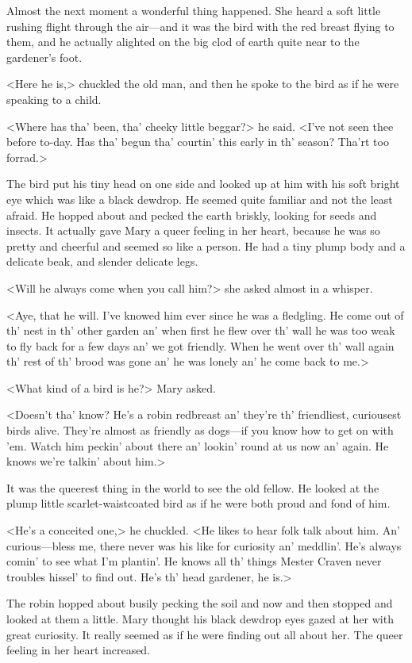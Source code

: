 Almost the next moment a wonderful thing happened. She heard a soft little rushing flight through the air—and it was the bird with the red breast flying to them, and he actually alighted on the big clod of earth quite near to the gardener's foot.

<Here he is,> chuckled the old man, and then he spoke to the bird as if he were speaking to a child.

<Where has tha' been, tha' cheeky little beggar?> he said. <I've not seen thee before to-day. Has tha' begun tha' courtin' this early in th' season? Tha'rt too forrad.>

The bird put his tiny head on one side and looked up at him with his soft bright eye which was like a black dewdrop. He seemed quite familiar and not the least afraid. He hopped about and pecked the earth briskly, looking for seeds and insects. It actually gave Mary a queer feeling in her heart, because he was so pretty and cheerful and seemed so like a person. He had a tiny plump body and a delicate beak, and slender delicate legs.

<Will he always come when you call him?> she asked almost in a whisper.

<Aye, that he will. I've knowed him ever since he was a fledgling. He come out of th' nest in th' other garden an' when first he flew over th' wall he was too weak to fly back for a few days an' we got friendly. When he went over th' wall again th' rest of th' brood was gone an' he was lonely an' he come back to me.>

<What kind of a bird is he?> Mary asked.

<Doesn't tha' know? He's a robin redbreast an' they're th' friendliest, curiousest birds alive. They're almost as friendly as dogs—if you know how to get on with 'em. Watch him peckin' about there an' lookin' round at us now an' again. He knows we're talkin' about him.>

It was the queerest thing in the world to see the old fellow. He looked at the plump little scarlet-waistcoated bird as if he were both proud and fond of him.

<He's a conceited one,> he chuckled. <He likes to hear folk talk about him. An' curious—bless me, there never was his like for curiosity an' meddlin'. He's always comin' to see what I'm plantin'. He knows all th' things Mester Craven never troubles hissel' to find out. He's th' head gardener, he is.>

The robin hopped about busily pecking the soil and now and then stopped and looked at them a little. Mary thought his black dewdrop eyes gazed at her with great curiosity. It really seemed as if he were finding out all about her. The queer feeling in her heart increased.


